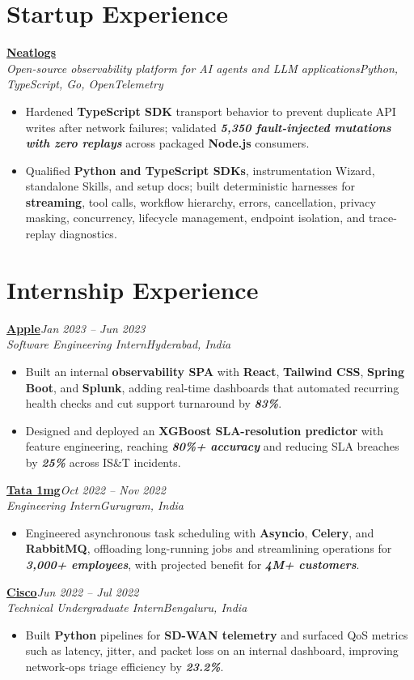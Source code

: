 \documentclass[10pt,a4paper]{article}
\newcommand{\metric}[1]{\textbf{\textit{#1}}}
\newcommand{\tech}[1]{\textbf{#1}}
\newcommand{\project}[1]{\textbf{#1}}
\newcommand{\entry}[4]{%
  \textbf{\underline{#1}}\hfill\textit{#3}\\%
  \textit{#2}\hfill \textit{#4}\vspace{-1pt}%
}
\begin{document}
\section{Startup Experience}
\entry{Neatlogs}{Open-source observability platform for AI agents and LLM applications}{}{Python, TypeScript, Go, OpenTelemetry}
\begin{itemize}
  \item Hardened \tech{TypeScript SDK} transport behavior to prevent duplicate API writes after network failures; validated \metric{5,350 fault-injected mutations with zero replays} across packaged \tech{Node.js} consumers.
  \item Qualified \tech{Python and TypeScript SDKs}, instrumentation Wizard, standalone Skills, and setup docs; built deterministic harnesses for \tech{streaming}, tool calls, workflow hierarchy, errors, cancellation, privacy masking, concurrency, lifecycle management, endpoint isolation, and trace-replay diagnostics.
\end{itemize}

\section{Internship Experience}
\entry{Apple}{Software Engineering Intern}{Jan 2023 -- Jun 2023}{Hyderabad, India}
\begin{itemize}
  \item Built an internal \project{observability SPA} with \tech{React}, \tech{Tailwind CSS}, \tech{Spring Boot}, and \tech{Splunk}, adding real-time dashboards that automated recurring health checks and cut support turnaround by \metric{83\%}.
  \item Designed and deployed an \tech{XGBoost SLA-resolution predictor} with feature engineering, reaching \metric{80\%+ accuracy} and reducing SLA breaches by \metric{25\%} across IS\&T incidents.
\end{itemize}

\entry{Tata 1mg}{Engineering Intern}{Oct 2022 -- Nov 2022}{Gurugram, India}
\begin{itemize}
  \item Engineered asynchronous task scheduling with \tech{Asyncio}, \tech{Celery}, and \tech{RabbitMQ}, offloading long-running jobs and streamlining operations for \metric{3,000+ employees}, with projected benefit for \metric{4M+ customers}.
\end{itemize}

\entry{Cisco}{Technical Undergraduate Intern}{Jun 2022 -- Jul 2022}{Bengaluru, India}
\begin{itemize}
  \item Built \tech{Python} pipelines for \tech{SD-WAN telemetry} and surfaced QoS metrics such as latency, jitter, and packet loss on an internal dashboard, improving network-ops triage efficiency by \metric{23.2\%}.
\end{itemize}
\end{document}
